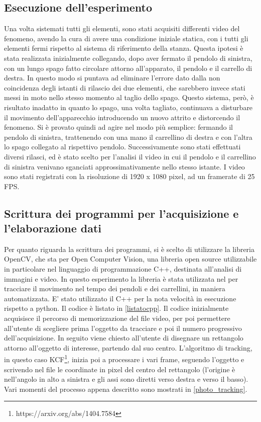 \documentclass[11pt, a4paper, twoside, italian]{article}
\begin{document}
\subsection{Esecuzione dell'esperimento}

Una volta sistemati tutti gli elementi, sono stati acquisiti differenti video del fenomeno, avendo la cura di avere una condizione
iniziale statica, con i tutti gli elementi fermi rispetto al sistema di riferimento della stanza.
Questa ipotesi è stata realizzata 
inizialmente collegando, dopo aver fermato il pendolo di sinistra, 
con un lungo spago fatto circolare attorno all'apparato, il pendolo e il carrello di destra.
In questo modo si puntava ad eliminare l'errore dato dalla non coincidenza degli istanti
di rilascio dei due elementi, che sarebbero invece stati messi in moto nello stesso momento al 
taglio dello spago.
Questo sistema, però, è risultato inadatto in quanto lo spago, una volta tagliato, continuava a 
disturbare il movimento dell'apparecchio introducendo un nuovo attrito e 
distorcendo il fenomeno.
Si è provato quindi ad agire nel modo più semplice: fermando il pendolo di sinistra, trattenendo con una mano il carrellino di destra e con l'altra lo spago 
collegato al rispettivo pendolo.
Successivamente sono stati effettuati diversi rilasci, ed è 
stato scelto per l'analisi il video in cui il pendolo e il carrellino di sinistra venivano
sganciati approssimativamente nello stesso istante.
I video sono stati registrati con la risoluzione
di 1920 x 1080 pixel, ad un framerate di 25 FPS.
\label{sezione_realizz}

\subsection{Scrittura dei programmi per l'acquisizione e l'elaborazione dati}

Per quanto riguarda la scrittura dei programmi, si è scelto di utilizzare 
la libreria OpenCV, che sta per Open Computer Vision, una libreria open source 
utilizzabile in particolare nel linguaggio di programmazione C++, 
destinata all'analisi di immagini e video. 
In questo esperimento la libreria è stata utilizzata nel per tracciare il 
movimento nel tempo dei pendoli e dei carrellini, in maniera automatizzata.
E' stato utilizzato il C++ per la nota velocità in esecuzione rispetto a 
python. Il codice è listato in \cref{listatocpp}.
Il codice inizialmente acquisisce il percorso di memorizzazione del file video, per poi 
permettere all'utente di scegliere prima l'oggetto da tracciare
 e poi 
il numero progressivo dell'acquisizione.
In seguito viene chiesto all'utente di disegnare un rettangolo attorno
all'oggetto di interesse, partendo dal suo centro.
L'algoritmo di tracking, in questo caso KCF\footnote{https://arxiv.org/abs/1404.7584}, 
inizia poi a processare i vari frame, seguendo l'oggetto e scrivendo nel file
le coordinate in pixel del centro del rettangolo (l'origine è nell'angolo in alto a sinistra e gli assi 
sono diretti verso destra e verso il basso).
Vari momenti del processo appena descritto sono mostrati in \cref{photo_tracking}.
\end{document}

